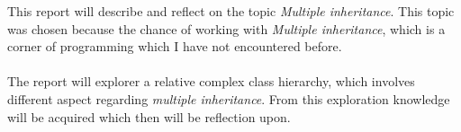 This report will describe and reflect on the topic \textit{Multiple inheritance}.
This topic was chosen because the chance of working with \textit{Multiple inheritance}, which is a corner of programming which I have not encountered before.\\\\
The report will explorer a relative complex class hierarchy, which involves different aspect regarding \textit{multiple inheritance}.
From this exploration knowledge will be acquired which then will be reflection upon.

